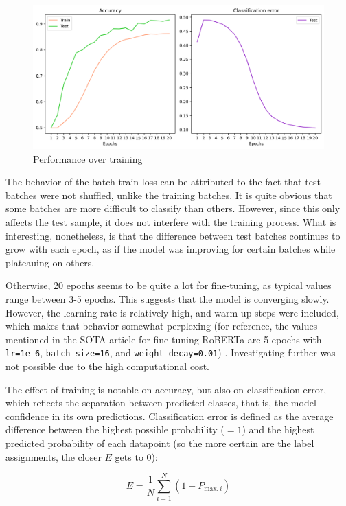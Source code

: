 \documentclass{article}
\begin{document}
\begin{figure}
  \centering
  \includegraphics[width=\textwidth]{RoBERTa_learning_curves_2}
  \caption{Performance over training}
  \label{fig:roberta-learning-2}
\end{figure}

The behavior of the batch train loss can be attributed to the fact that test batches were not shuffled, unlike the training batches. It is quite obvious that some batches are more difficult to classify than others. However, since this only affects the test sample, it does not interfere with the training process. What is interesting, nonetheless, is that the difference between test batches continues to grow with each epoch, as if the model was improving for certain batches while plateauing on others.

Otherwise, 20 epochs seems to be quite a lot for fine-tuning, as typical values range between 3-5 epochs. This suggests that the model is converging slowly. However, the learning rate is relatively high, and warm-up steps were included, which makes that behavior somewhat perplexing (for reference, the values mentioned in the SOTA article for fine-tuning RoBERTa are 5 epochs with \texttt{lr=1e-6},  \texttt{batch\_size=16}, and \texttt{weight\_decay=0.01}) \citep{csanady_llambert_2024}. Investigating further was not possible due to the high computational cost.

The effect of training is notable on accuracy, but also on classification error, which reflects the separation between predicted classes, that is, the model confidence in its own predictions. Classification error is defined as the average difference between the highest possible probability (\( =1 \)) and the highest predicted probability of each datapoint (so the more certain are the label assignments, the closer \( E \) gets to 0):

\[
E = \frac{1}{N} \sum_{i=1}^{N} (1 - P_{\text{max},i})
\]
\end{document}

